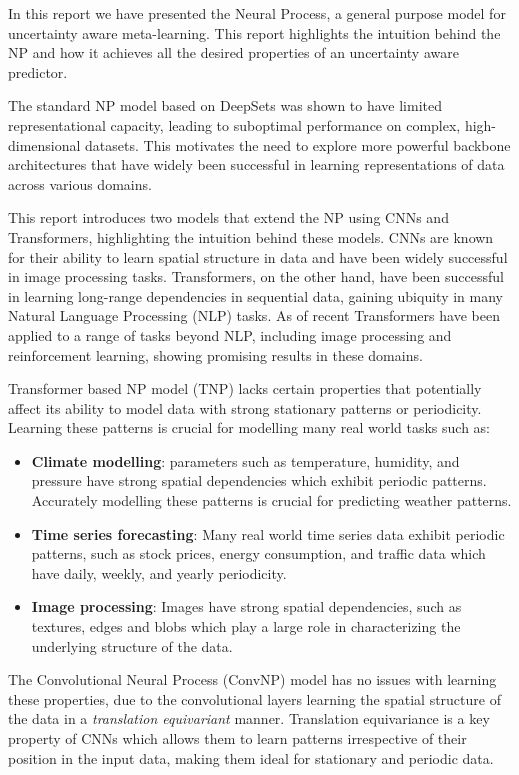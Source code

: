 \documentclass[../../main.tex]{subfiles}
\begin{document}
In this report we have presented the Neural Process, a general purpose model for uncertainty aware meta-learning. This report highlights the intuition behind the NP and how it achieves all the desired properties of an uncertainty aware predictor. 

The standard NP model based on DeepSets was shown to have limited representational capacity, leading to suboptimal performance on complex, high-dimensional datasets. This motivates the need to explore more powerful backbone architectures that have widely been successful in learning representations of data across various domains. 

This report introduces two models that extend the NP using CNNs and Transformers, highlighting the intuition behind these models. CNNs are known for their ability to learn spatial structure in data and have been widely successful in image processing tasks. Transformers, on the other hand, have been successful in learning long-range dependencies in sequential data, gaining ubiquity in many Natural Language Processing (NLP) tasks. As of recent Transformers have been applied to a range of tasks beyond NLP, including image processing and reinforcement learning, showing promising results in these domains. 

Transformer based NP model (TNP) lacks certain properties that potentially affect its ability to model data with strong stationary patterns or periodicity. Learning these patterns is crucial for modelling many real world tasks such as:

\begin{itemize}
	\item \textbf{Climate modelling}: parameters such as temperature, humidity, and pressure have strong spatial dependencies which exhibit periodic patterns. Accurately modelling these patterns is crucial for predicting weather patterns.
	\item \textbf{Time series forecasting}: Many real world time series data exhibit periodic patterns, such as stock prices, energy consumption, and traffic data which have daily, weekly, and yearly periodicity.
	\item \textbf{Image processing}: Images have strong spatial dependencies, such as textures, edges and blobs which play a large role in characterizing the underlying structure of the data.
\end{itemize}


The Convolutional Neural Process (ConvNP) model has no issues with learning these properties, due to the convolutional layers learning the spatial structure of the data in a \emph{translation equivariant} manner. Translation equivariance is a key property of CNNs which allows them to learn patterns irrespective of their position in the input data, making them ideal for stationary and periodic data.
\end{document}
